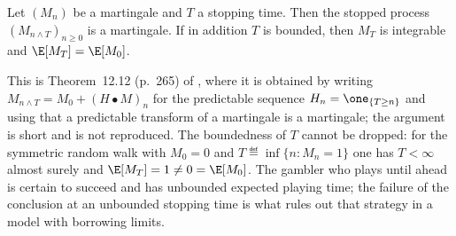 \begin{theorem}\label{thm:optional-stopping}
	Let $(M_n)$ be a martingale and $T$ a stopping time. Then the stopped process
	$(M_{n\wedge T})_{n\geq0}$ is a martingale. If in addition $T$ is bounded, then
	$M_T$ is integrable and $\E[M_T]=\E[M_0]$.
\end{theorem}

This is Theorem~12.12 (p.~265) of \textcite{legall2022measure}, where it is
obtained by writing $M_{n\wedge T}=M_0+(H\bullet M)_n$ for the predictable
sequence $H_n=\one_{\{T\geq n\}}$ and using that a predictable transform of a
martingale is a martingale; the argument is short and is not reproduced. The
boundedness of $T$ cannot be dropped: for the symmetric random walk with
$M_0=0$ and $T\eqdef\inf\{n : M_n=1\}$ one has $T<\infty$ almost surely and
$\E[M_T]=1\neq0=\E[M_0]$. The gambler who plays until ahead is certain to
succeed and has unbounded expected playing time; the failure of the conclusion at
an unbounded stopping time is what rules out that strategy in a model with
borrowing limits.

